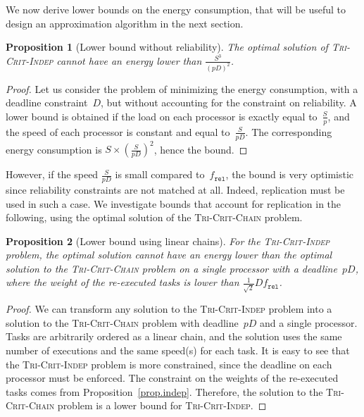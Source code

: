 \documentclass[a4paper]{article}
\theoremstyle{plain}
\newtheorem{proposition}{Proposition}
\theoremstyle{definition}
\theoremstyle{remark}
\newcommand{\fr}{\ensuremath{f_{\texttt{rel}}}\xspace}
\newcommand{\chain}{\textsc{Tri-Crit-Chain}\xspace}
\newcommand{\indep}{\textsc{Tri-Crit-In\-dep}\xspace}
\begin{document}
\medskip

We now derive lower bounds on the energy consumption, that will be
useful to design an approximation algorithm in the next section. 



\begin{proposition}[Lower bound without reliability]
 \label{bound.lp}
The optimal solution of \indep cannot have an energy lower than
 $\frac{S^3}{(pD)^2}$.
\end{proposition}

\begin{proof}
Let us consider the problem of minimizing the energy consumption, with
a deadline constraint~$D$, but without accounting for the constraint
on reliability. A lower bound is obtained if the load on each
processor is exactly equal to~$\frac{S}{p}$, and the speed of each
processor is constant and equal to~$\frac{S}{pD}$. The corresponding
energy consumption is $S \times \left(\frac{S}{pD}\right)^2$, hence
the bound. 
\end{proof}

However, if the speed $\frac{S}{pD}$ is small compared to~\fr,
the bound is very optimistic since reliability constraints are not
matched at all. Indeed, replication must be used in such a case. 
We investigate bounds that account for replication in the following,
using the optimal solution of the \chain problem. 





\begin{proposition}[Lower bound using linear chains]
    \label{bound.chain.improved}
    For the \indep problem, the optimal solution cannot have an energy
    lower than the optimal solution to the \chain problem on a single
    processor with a deadline~$pD$, where the weight of the
    re-executed tasks is lower than $\frac{1}{\sqrt{2}}D\fr$.
\end{proposition}

\begin{proof}
  We can transform any solution to the \indep problem into a solution
  to the \chain problem with deadline~$pD$ and a single
  processor. Tasks are arbitrarily ordered as a linear chain, and the
  solution uses the same number of executions and the same speed(s)
  for each task. It is easy to see that the \indep problem is more
  constrained, since the deadline on each processor must be enforced. 
  The constraint on the weights of the re-executed tasks comes from
  Proposition~\ref{prop.indep}. Therefore, the solution to the \chain
  problem is a lower bound for \indep. 
\end{proof}
\end{document}
